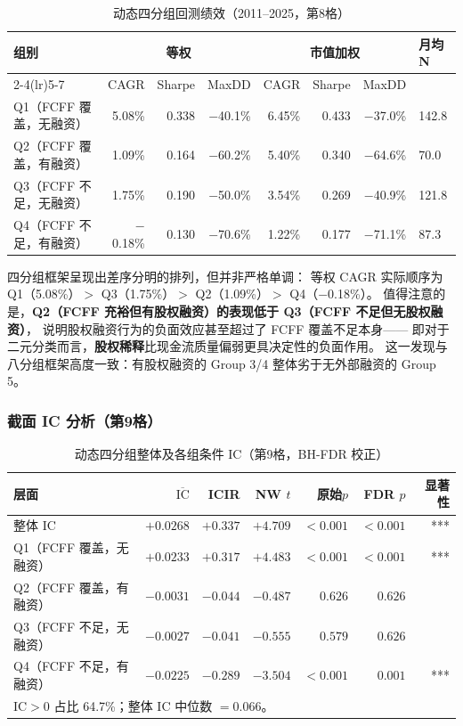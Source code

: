 \documentclass[a4paper,10pt]{article}
\begin{document}
\begin{table}[H]
\centering
\caption{动态四分组回测绩效（2011--2025，第8格）}
\label{tab:4g_perf}
\begin{tabular}{@{}lrrrrrrl@{}}
\toprule
\multirow{2}{*}{组别} &
\multicolumn{3}{c}{等权} &
\multicolumn{3}{c}{市值加权} &
\multirow{2}{*}{月均N} \\
\cmidrule(lr){2-4}\cmidrule(lr){5-7}
 & CAGR & Sharpe & MaxDD & CAGR & Sharpe & MaxDD & \\
\midrule
Q1（FCFF 覆盖，无融资） & 5.08\%  & 0.338 & $-$40.1\% & 6.45\%  & 0.433 & $-$37.0\% & 142.8 \\
Q2（FCFF 覆盖，有融资） & 1.09\%  & 0.164 & $-$60.2\% & 5.40\%  & 0.340 & $-$64.6\% & 70.0 \\
Q3（FCFF 不足，无融资） & 1.75\%  & 0.190 & $-$50.0\% & 3.54\%  & 0.269 & $-$40.9\% & 121.8 \\
Q4（FCFF 不足，有融资） & $-$0.18\% & 0.130 & $-$70.6\% & 1.22\%  & 0.177 & $-$71.1\% & 87.3 \\
\bottomrule
\end{tabular}
\end{table}

四分组框架呈现出差序分明的排列，但并非严格单调：
等权 CAGR 实际顺序为 Q1（5.08\%）$>$ Q3（1.75\%）$>$ Q2（1.09\%）$>$ Q4（$-$0.18\%）。
值得注意的是，\textbf{Q2（FCFF 充裕但有股权融资）的表现低于 Q3（FCFF 不足但无股权融资）}，
说明股权融资行为的负面效应甚至超过了 FCFF 覆盖不足本身——
即对于二元分类而言，\textbf{股权稀释}比现金流质量偏弱更具决定性的负面作用。
这一发现与八分组框架高度一致：有股权融资的 Group 3/4 整体劣于无外部融资的 Group 5。

\subsubsection{截面 IC 分析（第9格）}

\begin{table}[H]
\centering
\caption{动态四分组整体及各组条件 IC（第9格，BH-FDR 校正）}
\label{tab:4g_ic}
\begin{tabular}{@{}lrrrrrr@{}}
\toprule
层面 & $\overline{\mathrm{IC}}$ & ICIR & NW $t$ & 原始$p$ & FDR $p$ & 显著性 \\
\midrule
整体 IC & $+0.0268$ & $+0.337$ & $+4.709$ & $<0.001$ & $<0.001$ & *** \\
Q1（FCFF 覆盖，无融资） & $+0.0233$ & $+0.317$ & $+4.483$ & $<0.001$ & $<0.001$ & *** \\
Q2（FCFF 覆盖，有融资） & $-0.0031$ & $-0.044$ & $-0.487$ & $0.626$ & $0.626$ & \\
Q3（FCFF 不足，无融资） & $-0.0027$ & $-0.041$ & $-0.555$ & $0.579$ & $0.626$ & \\
Q4（FCFF 不足，有融资） & $-0.0225$ & $-0.289$ & $-3.504$ & $<0.001$ & $0.001$ & *** \\
\bottomrule
\multicolumn{7}{l}{\footnotesize IC$>$0 占比 64.7\%；整体 IC 中位数 $= 0.066$。} \\
\end{tabular}
\end{table}
\end{document}
